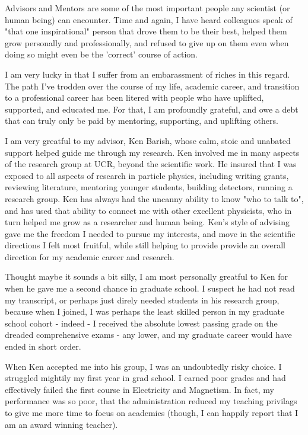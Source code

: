 Advisors and Mentors are some of the most important people any scientist (or
human being) can encounter. Time and again, I have heard colleagues speak of
"that one inspirational" person that drove them to be their best, helped them
grow personally and professionally, and refused to give up on them even when
doing so might even be the 'correct' course of action.

I am very lucky in that I suffer from an embarassment of riches in this regard.
The path I've trodden over the course of my life, academic career, and
transition to a professional career has been litered with people who have
uplifted, supported, and educated me. For that, I am profoundly grateful, and
owe a debt that can truly only be paid by mentoring, supporting, and uplifting
others.

I am very greatful to my advisor, Ken Barish, whose calm, stoic and unabated
support helped guide me through my research. Ken involved me in many aspects of
the research group at UCR, beyond the scientific work. He insured that I was
exposed to all aspects of research in particle physics, including writing
grants, reviewing literature, mentoring younger students, building detectors,
running a research group.  Ken has always had the uncanny ability to know "who
to talk to", and has used that ability to connect me with other excellent
physicists, who in turn helped me grow as a researcher and human being. Ken's
style of advising gave me the freedom I needed to pursue my interests, and move
in the scientific directions I felt most fruitful, while still helping to
provide provide an overall direction for my academic career and research. 

Thought maybe it sounds a bit silly, I am most personally greatful to Ken for
when he gave me a second chance in graduate school. I suspect he had not read
my transcript, or perhaps just direly needed students in his research group,
because when I joined, I was perhaps the least skilled person in my graduate
school cohort - indeed - I received the absolute lowest passing grade on the
dreaded comprehensive exams - any lower, and my graduate career would have
ended in short order.

When Ken accepted me into his group, I was an undoubtedly risky choice. I
struggled mightily my first year in grad school.  I earned poor grades and had
effectively failed the first course in Electricity and Magnetism. In fact, my
performance was so poor, that the administration reduced my teaching
privilags to give me more time to focus on academics (though, I can happily
report that I am an award winning teacher).

